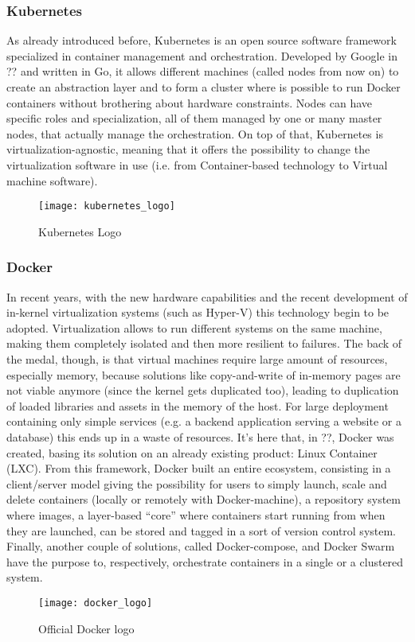 \subsubsection{Kubernetes}

As already introduced before, Kubernetes is an open source software framework
specialized in container management and orchestration. Developed by Google in
?? and written in Go, it allows different
machines (called nodes from now on) to create an abstraction layer and to form a
cluster where is possible to run Docker containers without brothering about
hardware constraints. Nodes can have specific roles and specialization, all of
them managed by one or many master nodes, that actually manage the
orchestration. On top of that, Kubernetes is virtualization-agnostic, meaning
that it offers the possibility to change the virtualization software in use
(i.e. from Container-based technology to Virtual machine software).
\begin{figure}[h]
 \centering \texttt{[image: kubernetes\_logo]}
 \caption{Kubernetes Logo}
 \label{chap:intro:img:k8s_logo}
\end{figure}


\subsubsection{Docker}

In recent years, with the new hardware capabilities and the recent development
of in-kernel virtualization systems (such as Hyper-V) this technology begin to
be adopted. Virtualization allows to run different systems on the same machine,
making them completely isolated and then more resilient to failures. The back of
the medal, though, is that virtual machines require large amount of resources,
especially memory, because solutions like copy-and-write of in-memory pages are
not viable anymore (since the kernel gets duplicated too), leading to
duplication of loaded libraries and assets in the memory of the host. For large
deployment containing only simple services (e.g. a backend application serving a
website or a database) this ends up in a waste of resources.  It's here that,
in ??, Docker was created, basing its solution
on an already existing product: Linux Container (LXC). From this framework,
Docker built an entire ecosystem, consisting in a client/server model giving the
possibility for users to simply launch, scale and delete containers (locally or
remotely with Docker-machine), a repository system where images, a layer-based
``core'' where containers start running from when they are launched, can be
stored and tagged in a sort of version control system. Finally, another couple
of solutions, called Docker-compose, and Docker Swarm have the purpose to,
respectively, orchestrate containers in a single or a clustered system.
\begin{figure}[t]
 \centering \texttt{[image: docker\_logo]}
 \caption{Official Docker logo}
 \label{chap:intro:img:docker_logo}
\end{figure}

